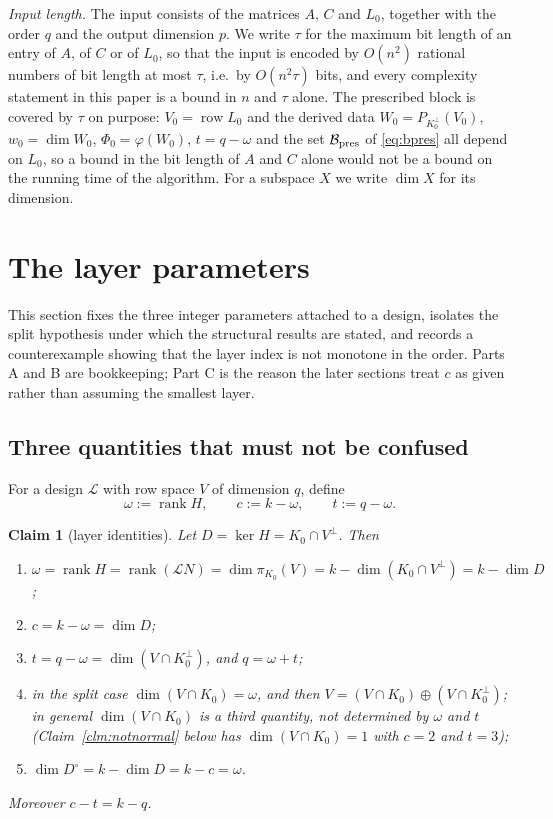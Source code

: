 \documentclass[journal]{IEEEtran}
\theoremstyle{plainn}
\newtheorem{claim}[thm]{Claim}
\theoremstyle{remark}
\newcommand{\row}{\operatorname{row}}
\newcommand{\rank}{\operatorname{rank}}
\begin{document}
\emph{Input length.} The input consists of the matrices $A$, $C$ and $L_0$, together with the order $q$ and the output
dimension $p$. We write $\tau$ for the maximum bit length of an entry of $A$, of $C$ or of $L_0$, so that
the input is encoded by $O(n^2)$ rational numbers of bit length at most $\tau$, i.e.\ by $O(n^2\tau)$ bits,
and every complexity statement in this paper is a bound in $n$ and $\tau$ alone. The prescribed block is
covered by $\tau$ on purpose: $V_0=\row L_0$ and the derived data $W_0=P_{K_0^\perp}(V_0)$,
$w_0=\dim W_0$, $\Phi_0=\varphi(W_0)$, $t=q-\omega$ and the set $\mathcal B_{\rm pres}$ of \eqref{eq:bpres}
all depend on $L_0$, so a bound in the bit length of $A$ and $C$ alone would not be a bound on the running
time of the algorithm. For a subspace $X$ we write $\dim X$ for its dimension.

\section{The layer parameters}\label{sec:layers}

This section fixes the three integer parameters attached to a design, isolates the split hypothesis under
which the structural results are stated, and records a counterexample showing that the layer index is not
monotone in the order. Parts A and B are bookkeeping; Part C is the reason the later sections treat $c$
as given rather than assuming the smallest layer.

\subsection{Three quantities that must not be confused}\label{sec:layers:a}

For a design $\mathcal L$ with row space $V$ of dimension $q$, define
\begin{equation}\label{eq:params}
\omega:=\rank H,\qquad c:=k-\omega,\qquad t:=q-\omega .
\end{equation}

\begin{claim}[layer identities]\label{clm:identities}
Let $D=\ker H=K_0\cap V^\perp$. Then
\begin{enumerate}[label=(\arabic*),leftmargin=*,itemsep=1pt,topsep=2pt]
\item {\raggedright $\omega=\rank H=\rank(\mathcal L N)=\dim\pi_{K_0}(V)
=k-\dim(K_0\cap V^\perp)=k-\dim D$;\par}
\item $c=k-\omega=\dim D$;
\item $t=q-\omega=\dim(V\cap K_0^\perp)$, and $q=\omega+t$;
\item in the split case $\dim(V\cap K_0)=\omega$, and then
$V=(V\cap K_0)\oplus(V\cap K_0^\perp)$; in general $\dim(V\cap K_0)$ is a third quantity, not determined
by $\omega$ and $t$ (Claim~\ref{clm:notnormal} below has $\dim(V\cap K_0)=1$ with $c=2$ and $t=3$);
\item $\dim D^\circ=k-\dim D=k-c=\omega$.
\end{enumerate}
Moreover $c-t=k-q$.
\end{claim}
\end{document}
